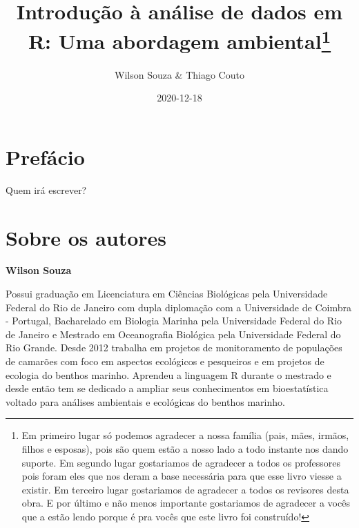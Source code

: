 \documentclass[14pt,titlepage, oneside, openany, a4paper]{book}
\title{Introdução à análise de dados em R: Uma abordagem ambiental\thanks{Em primeiro lugar só podemos agradecer a nossa família (pais, mães, irmãos, filhos e esposas), pois são quem estão a nosso lado a todo instante nos dando suporte. Em segundo lugar gostariamos de agradecer a todos os professores pois foram eles que nos deram a base necessária para que esse livro viesse a existir. Em terceiro lugar gostariamos de agradecer a todos os revisores desta obra. E por último e não menos importante gostariamos de agradecer a vocês que a estão lendo porque é pra vocês que este livro foi construído!}}
\author{Wilson Souza \& Thiago Couto}
\date{2020-12-18}
\let\oldmaketitle\maketitle
\begin{document}
\maketitle


\begin{figure}
  
\end{figure}

\let\maketitle\oldmaketitle
\maketitle

\renewcommand*\contentsname{Índice}
{
\hypersetup{linkcolor=}
\setcounter{tocdepth}{1}
\tableofcontents
}
\listoftables
\listoffigures
\hypertarget{prefuxe1cio}{%
\chapter*{Prefácio}\label{prefuxe1cio}}

Quem irá escrever?

\hypertarget{sobre-os-autores}{%
\chapter*{Sobre os autores}\label{sobre-os-autores}}

\textbf{Wilson Souza}

Possui graduação em Licenciatura em Ciências Biológicas pela Universidade Federal do Rio de Janeiro com dupla diplomação com a Universidade de Coimbra - Portugal, Bacharelado em Biologia Marinha pela Universidade Federal do Rio de Janeiro e Mestrado em Oceanografia Biológica pela Universidade Federal do Rio Grande. Desde 2012 trabalha em projetos de monitoramento de populações de camarões com foco em aspectos ecológicos e pesqueiros e em projetos de ecologia do benthos marinho. Aprendeu a linguagem R durante o mestrado e desde então tem se dedicado a ampliar seus conhecimentos em bioestatística voltado para análises ambientais e ecológicas do benthos marinho.
\end{document}
